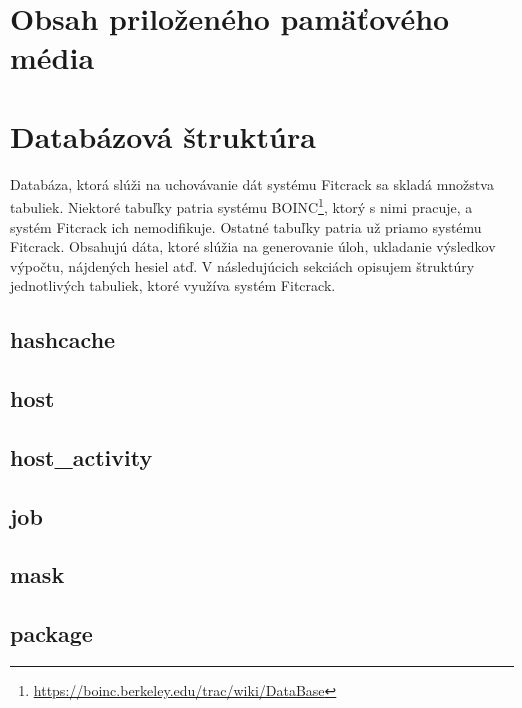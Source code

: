 \documentclass[slovak]{fitthesis}
\begin{document}
  \ifODSAZ
    \setlength{\parskip}{0.5\bigskipamount}
  \else
    \setlength{\parskip}{0pt}
  \fi
  
  \iftwoside
    \cleardoublepage
  \fi
  

\chapter{Obsah priloženého pamäťového média}

\chapter{Databázová štruktúra}
\label{DBstructure}

Databáza, ktorá slúži na uchovávanie dát systému Fitcrack sa skladá množstva tabuliek. Niektoré tabuľky patria systému BOINC\footnote{\url{https://boinc.berkeley.edu/trac/wiki/DataBase}}, ktorý s nimi pracuje, a systém Fitcrack ich nemodifikuje. Ostatné tabuľky patria už priamo systému Fitcrack. Obsahujú dáta, ktoré slúžia na generovanie úloh, ukladanie výsledkov výpočtu, nájdených hesiel atď. V následujúcich sekciách opisujem štruktúry jednotlivých tabuliek, ktoré využíva systém Fitcrack.

\section{hashcache}

\section{host}

\section{host\_activity}


\section{job}


\section{mask}


\section{package}
\end{document}
